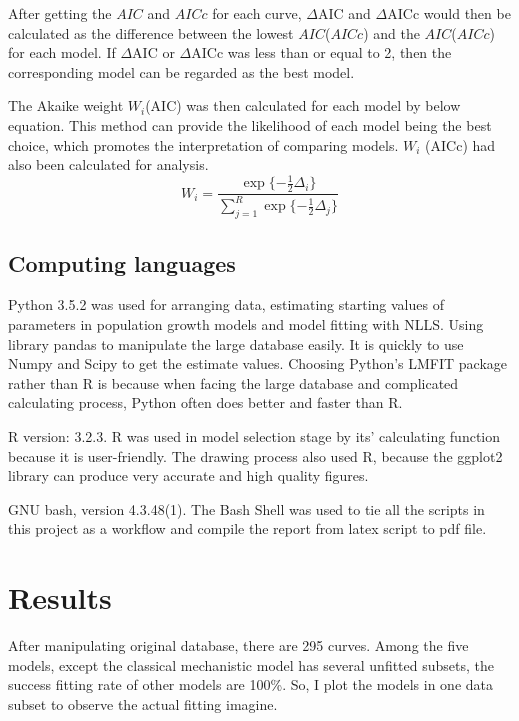\documentclass[11pt]{article}
\begin{document}
	After getting the $AIC$ and $AICc$ for each curve, $\Delta$AIC and $\Delta$AICc would then be calculated as the difference between the lowest $AIC$($AICc$) and the $AIC$($AICc$) for each model. If $\Delta$AIC or $\Delta$AICc was less than or equal to 2, then the corresponding model can be regarded as the best model\citep{burnham2004multimodel}.
	
	The Akaike weight $W_i$(AIC) was then calculated for each model by below equation. This method can provide the likelihood of each model being the best choice, which promotes the interpretation of comparing models. $W_i$ (AICc) had also been calculated for analysis\citep{wagenmakers2004aic}.
	\begin{equation}
        W_i = \frac{\exp\{-\frac{1}{2}\Delta_i\}}{\sum_{j=1}^{R} \exp\{-\frac{1}{2}\Delta_j\}}
    \end{equation}
    
    \subsection{Computing languages}
    Python 3.5.2 was used for arranging data, estimating starting values of parameters in population growth models and model fitting with NLLS. Using library pandas to manipulate the large database easily. It is quickly to use Numpy and Scipy to get the estimate values\citep{mckinney2011pandas}. Choosing Python’s LMFIT package rather than R is because when facing the large database and complicated calculating process, Python often does better and faster than R.
    
    R version: 3.2.3. R was used in model selection stage by its’ calculating function because it is user-friendly. The drawing process also used R, because the ggplot2 library can produce very accurate and high quality figures\citep{ginestet2011ggplot2}.
    
    GNU bash, version 4.3.48(1). The Bash Shell was used to tie all the scripts in this project as a workflow and compile the report from latex script to pdf file.
    
\section{Results}
After manipulating original database, there are 295 curves. Among the five models, except the classical mechanistic model has several unfitted subsets, the success fitting rate of other models are 100\%. So, I plot the models in one data subset to observe the actual fitting imagine.
\end{document}
